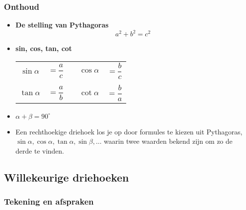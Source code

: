 \subsubsection{Onthoud}
\begin{onthoud}

\begin{figure}[H]
	\centering 
	 
\end{figure}

\begin{itemize}
	\item \textbf{De stelling van Pythagoras}
	\[a^2+b^2=c^2\]
	\item \textbf{sin, cos, tan, cot}
	\begin{center}
\begin{tabular}{ccccc}
$\sin \alpha$ &$= \dfrac{a}{c}$ &\qquad\qquad\qquad& $\cos \alpha$ &$= \dfrac{b}{c}$\\
&&&&\\
$\tan \alpha$ &$= \dfrac{a}{b}$ &\qquad\qquad\qquad& $\cot \alpha$ &$= \dfrac{b}{a}$
\end{tabular}
\end{center}
	\item $\alpha + \beta = 90^\circ$
	\item Een rechthoekige driehoek los je op door formules te kiezen uit Pythagoras, $\sin \alpha, \cos \alpha, \tan\alpha, \sin \beta, \ldots$ waarin twee waarden bekend zijn om zo de derde te vinden.
\end{itemize}
\end{onthoud}


\subsection{Willekeurige driehoeken}


\subsubsection{Tekening en afspraken}


\begin{figure}[H]
\centering

\end{figure}

